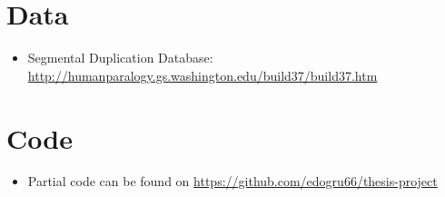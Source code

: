 \appendix
\chapter{Data}
\begin{itemize}
    \item Segmental Duplication Database: \url{http://humanparalogy.gs.washington.edu/build37/build37.htm}
\end{itemize}

\chapter{Code}
\begin{itemize}
    \item Partial code can be found on \url{https://github.com/edogru66/thesis-project}
\end{itemize}